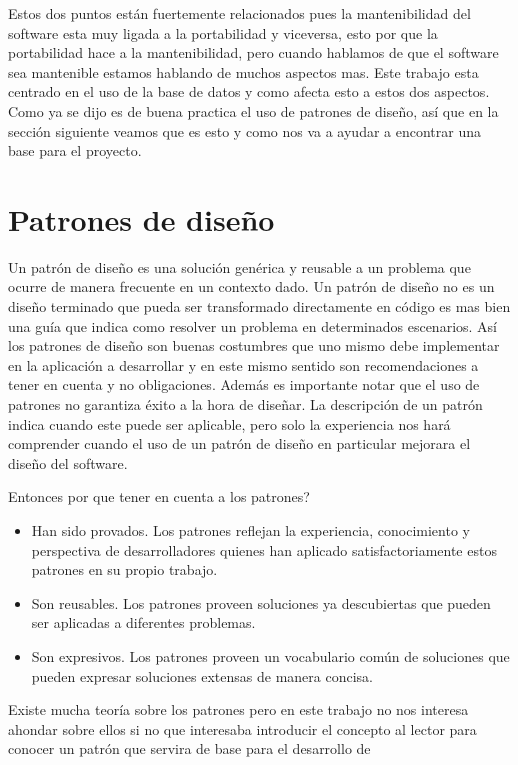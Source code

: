 Estos dos puntos están fuertemente relacionados pues la mantenibilidad del software esta muy ligada a la portabilidad y viceversa, esto por que la portabilidad hace a la mantenibilidad, pero cuando hablamos de que el software sea mantenible estamos hablando de muchos aspectos mas. Este trabajo esta centrado en el uso de la base de datos y como afecta esto a estos dos aspectos. Como ya se dijo es de buena practica el uso de patrones de diseño, así que en la sección siguiente veamos que es esto y como nos va a ayudar a encontrar una base para el proyecto. 
\section{Patrones de diseño}
Un patrón de diseño es una solución genérica y reusable  a un problema que ocurre de manera frecuente en un contexto dado. Un patrón de diseño no es un diseño terminado que pueda ser transformado directamente en código es mas bien una guía que indica como resolver un problema en determinados escenarios. Así los patrones de diseño son buenas costumbres que uno mismo debe implementar en la aplicación a desarrollar y en este mismo sentido son recomendaciones a tener en cuenta y no obligaciones\cite{Metsker:2002:DPJ}. Además es importante notar que el uso de patrones no garantiza éxito a la hora de diseñar. La descripción de un patrón indica cuando este puede ser aplicable, pero solo la experiencia nos hará comprender cuando el uso de un patrón de diseño en particular mejorara el diseño del software\cite{java:patrones}.


Entonces por que tener en cuenta a los patrones?
\begin{itemize}
\item Han sido provados. Los patrones reflejan la experiencia, conocimiento y perspectiva de desarrolladores quienes han aplicado satisfactoriamente estos patrones en su propio trabajo.

\item Son reusables. Los patrones proveen soluciones ya descubiertas que pueden ser aplicadas a diferentes problemas.

\item Son expresivos. Los patrones proveen un vocabulario común de soluciones que pueden expresar soluciones extensas de manera concisa.
\end{itemize}
Existe mucha teoría sobre los patrones pero en este trabajo no nos interesa ahondar sobre ellos si no que interesaba introducir el concepto al lector para conocer un patrón que servira de base para el desarrollo de \jj
